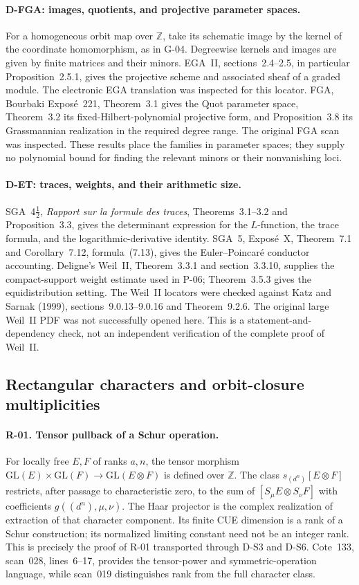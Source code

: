 \documentclass[11pt,a4paper]{article}
\theoremstyle{definition}\newtheorem{definition}{Definition}
\begin{document}
\paragraph{D-FGA: images, quotients, and projective parameter spaces.}
For a homogeneous orbit map over $\mathbb Z$, take its schematic image by the kernel of the coordinate homomorphism, as in G-04. Degreewise kernels and images are given by finite matrices and their minors. EGA~II, sections~2.4--2.5, in particular Proposition~2.5.1, gives the projective scheme and associated sheaf of a graded module. The electronic EGA translation was inspected for this locator. FGA, Bourbaki Expos\'e~221, Theorem~3.1 gives the Quot parameter space, Theorem~3.2 its fixed-Hilbert-polynomial projective form, and Proposition~3.8 its Grassmannian realization in the required degree range. The original FGA scan was inspected. These results place the families in parameter spaces; they supply no polynomial bound for finding the relevant minors or their nonvanishing loci.

\paragraph{D-ET: traces, weights, and their arithmetic size.}
SGA~4$\frac12$, \emph{Rapport sur la formule des traces}, Theorems~3.1--3.2 and Proposition~3.3, gives the determinant expression for the $L$-function, the trace formula, and the logarithmic-derivative identity. SGA~5, Expos\'e~X, Theorem~7.1 and Corollary~7.12, formula~(7.13), gives the Euler--Poincar\'e conductor accounting. Deligne's Weil~II, Theorem~3.3.1 and section~3.3.10, supplies the compact-support weight estimate used in P-06; Theorem~3.5.3 gives the equidistribution setting. The Weil~II locators were checked against Katz and Sarnak (1999), sections~9.0.13--9.0.16 and Theorem~9.2.6. The original large Weil~II PDF was not successfully opened here. This is a statement-and-dependency check, not an independent verification of the complete proof of Weil~II.

\subsection{Rectangular characters and orbit-closure multiplicities}

\paragraph{R-01. Tensor pullback of a Schur operation.}
For locally free $E,F$ of ranks $a,n$, the tensor morphism $\mathrm{GL}(E)\times\mathrm{GL}(F)\to\mathrm{GL}(E\otimes F)$ is defined over $\mathbb Z$. The class $s_{(d^n)}[E\otimes F]$ restricts, after passage to characteristic zero, to the sum of $[S_\mu E\otimes S_\nu F]$ with coefficients $g((d^n),\mu,\nu)$. The Haar projector is the complex realization of extraction of that character component. Its finite CUE dimension is a rank of a Schur construction; its normalized limiting constant need not be an integer rank. This is precisely the proof of R-01 transported through D-S3 and D-S6. Cote~133, scan~028, lines~6--17, provides the tensor-power and symmetric-operation language, while scan~019 distinguishes rank from the full character class.
\end{document}
